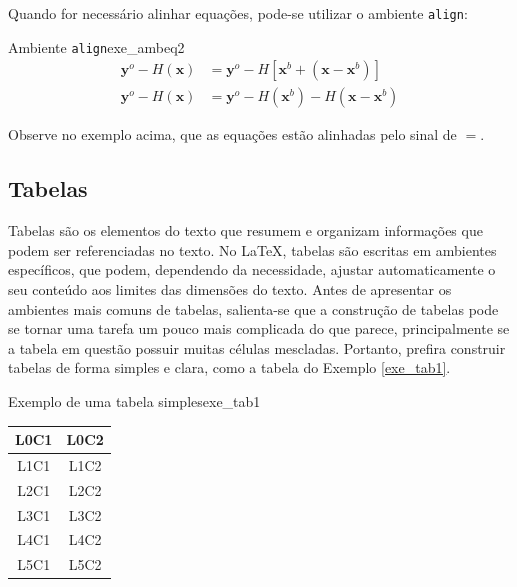 Quando for necessário alinhar equações, pode-se utilizar o ambiente \texttt{align}:


\begin{texexptitled}[breakable,center lower,enhanced,middle=2mm]{Ambiente \texttt{align}}{exe_ambeq2}
\begin{align*}
\label{apI_eq:3}
\mathbf{y}^{o} - \textit{H}(\mathbf{x}) & = \mathbf{y}^{o} - \textit{H}[\mathbf{x}^{b} + (\mathbf{x} - \mathbf{x}^{b})] \\
\label{apI_eq:4}
\mathbf{y}^{o} - \textit{H}(\mathbf{x}) & = \mathbf{y}^{o} - \textit{H}(\mathbf{x}^{b}) - \textit{H}(\mathbf{x} - \mathbf{x}^{b})
\end{align*}
\end{texexptitled}

Observe no exemplo acima, que as equações estão alinhadas pelo sinal de \texttt{$=$}.

\subsection{Tabelas}
\label{sec:tabs}

Tabelas são os elementos do texto que resumem e organizam informações que podem ser referenciadas no texto. No LaTeX, tabelas são escritas em ambientes específicos, que podem, dependendo da necessidade, ajustar automaticamente o seu conteúdo aos limites das dimensões do texto. Antes de apresentar os ambientes mais comuns de tabelas, salienta-se que a construção de tabelas pode se tornar uma tarefa um pouco mais complicada do que parece, principalmente se a tabela em questão possuir muitas células mescladas. Portanto, prefira construir tabelas de forma simples e clara, como a tabela do Exemplo \ref{exe_tab1}.

\begin{texexptitled}[breakable,center lower,enhanced,middle=2mm]{Exemplo de uma tabela simples}{exe_tab1}
\begin{tabular}{c c}
\hline 
\textbf{L0C1} & \textbf{L0C2} \\
\hline
L1C1 & L1C2 \\
L2C1 & L2C2 \\
L3C1 & L3C2 \\
L4C1 & L4C2 \\
L5C1 & L5C2 \\
\hline
\end{tabular}
\end{texexptitled}


